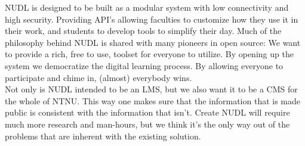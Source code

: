 \noindent
NUDL is designed to be built as a modular system with low connectivity and high security. Providing API's allowing faculties to customize how they use it in their work, and students to develop tools to simplify their day. Much of the philosophy behind NUDL is shared with many pioneers in open source: We want to provide a rich, free to use, toolset for everyone to utilize. By opening up the system we democratize the digital learning process. By allowing everyone to participate and chime in, (almost) everybody wins. \\

\noindent
Not only is NUDL intended to be an LMS, but we also want it to be a CMS for the whole of NTNU. This way one makes sure that the information that is made public is consistent with the information that isn't. Create NUDL will require much more research and man-hours, but we think it's the only way out of the problems that are inherent with the existing solution.
